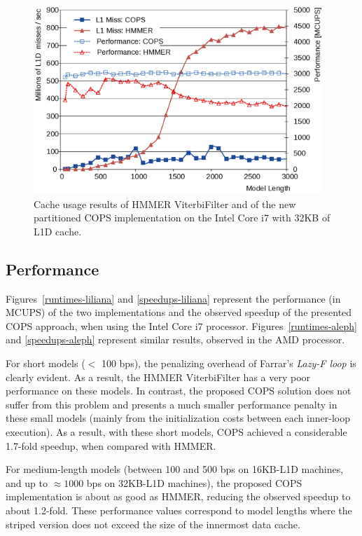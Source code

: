 \documentclass{bmcart}
\begin{document}
\begin{figure}[!b]
  \centering
  \includegraphics[width=0.97\textwidth]{img/cache.eps} 
  \caption{Cache usage results of HMMER ViterbiFilter and of the new partitioned COPS implementation on the Intel Core i7 with 32KB of L1D cache.}
  \label{cache-misses-part}
\end{figure}

\subsection*{Performance}

Figures~\ref{runtimes-liliana} and \ref{speedups-liliana} represent the performance (in \ac{MCUPS}) of the two implementations and the observed speedup of the presented \ac{COPS} approach, when using the Intel Core i7 processor. Figures~\ref{runtimes-aleph} and \ref{speedups-aleph} represent similar results, observed in the AMD processor.

For short models ($<$ 100 bps), the penalizing overhead of Farrar's \textit{Lazy-F loop} is clearly evident. As a result, the HMMER ViterbiFilter has a very poor performance on these models. In contrast, the proposed COPS solution does not suffer from this problem and presents a much smaller performance penalty in these small models (mainly from the initialization costs between each inner-loop execution). As a result, with these short models, \ac{COPS} achieved a considerable 1.7-fold speedup, when compared with HMMER.
 
For medium-length models (between 100 and 500 bps on 16KB-\ac{L1D} machines, and up to ${\approx}1000$ bps on 32KB-\ac{L1D} machines), the proposed \ac{COPS} implementation is about as good as HMMER, reducing the observed speedup to about 1.2-fold. These performance values correspond to model lengths where the striped version does not exceed the size of the innermost data cache.
\end{document}
